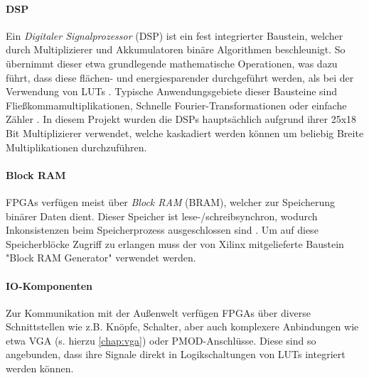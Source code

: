 \documentclass[a4paper,12pt,onesided]{report}
\begin{document}
\paragraph{DSP}
Ein \textit{Digitaler Signalprozessor} (DSP) ist ein fest integrierter Baustein, welcher durch Multiplizierer und Akkumulatoren binäre Algorithmen beschleunigt.
So übernimmt dieser etwa grundlegende mathematische Operationen, was dazu führt, dass diese flächen- und energiesparender durchgeführt werden, als bei der Verwendung von LUTs \cite[S. 52]{dsps}.
Typische Anwendungsgebiete dieser Bausteine sind Fließkommamultiplikationen, Schnelle Fourier-Transformationen oder einfache Zähler \cite[S. 14]{dsps}. 
In diesem Projekt wurden die DSPs hauptsächlich aufgrund ihrer 25x18 Bit Multiplizierer verwendet, welche kaskadiert werden können um beliebig Breite Multiplikationen durchzuführen.

\paragraph{Block RAM}
FPGAs verfügen meist über \textit{Block RAM} (BRAM), welcher zur Speicherung binärer Daten dient. Dieser Speicher ist lese-/schreibsynchron, wodurch Inkonsistenzen beim Speicherprozess ausgeschlossen sind \cite[S. 11]{bram}. Um auf diese Speicherblöcke Zugriff zu erlangen muss der von Xilinx mitgelieferte Baustein "Block RAM Generator" verwendet werden.

\paragraph{IO-Komponenten}
Zur Kommunikation mit der Außenwelt verfügen FPGAs über diverse Schnittstellen wie z.B. Knöpfe, Schalter, aber auch komplexere Anbindungen wie etwa VGA (s. hierzu \autoref{chap:vga}) oder PMOD-Anschlüsse. %
Diese sind so angebunden, dass ihre Signale direkt in Logikschaltungen von LUTs integriert werden können.

\end{document}
